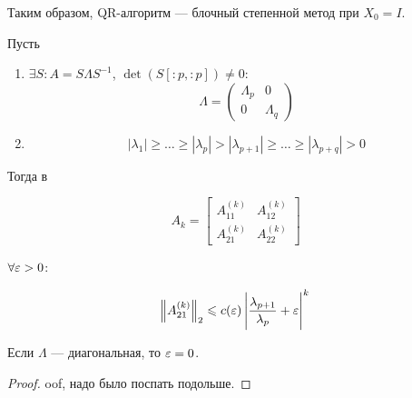 Таким образом, QR-алгоритм --- блочный степенной метод при $X_0 = I$.

\begin{theorem}
    Пусть

    \begin{enumerate}
        \item $\exists S: A = S \Lambda S^{-1}$, $\det(S[:p,:p]) \ne 0$:
            \[
                \Lambda
                = \begin{pmatrix} \Lambda_p & 0 \\ 0 & \Lambda_q \end{pmatrix}
            \]
        \item
            \[
                |\lambda_1| \ge \dots \ge |\lambda_p| > |\lambda_{p + 1}| \ge
                \dots \ge |\lambda_{p + q}| > 0
            \]
    \end{enumerate}

    Тогда в

    \[
        A_k = \begin{bmatrix}
            A_{11}^{(k)} & A_{12}^{(k)} \\
            A_{21}^{(k)} & A_{22}^{(k)}
        \end{bmatrix}
    \]

    $\forall \varepsilon > 0$:

    \[
        \norm{A_{21}^{(k)}}_2 \leqslant c(\varepsilon) \left|
            \frac{\lambda_{p + 1}}{\lambda_p} + \varepsilon \right|^k
    \]

    Если $\Lambda$ --- диагональная, то $\varepsilon = 0$.
\end{theorem}

\begin{proof}
    oof, надо было поспать подольше.
\end{proof}
